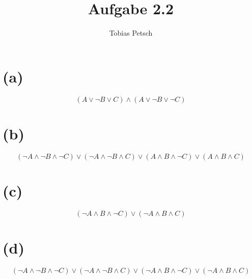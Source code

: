 \documentclass[a4paper,12pt]{article}
\title{Aufgabe 2.2}
\author{Tobias Petsch}
\date{}
\begin{document}
\maketitle

\section*{(a)}

\[
(A \lor \neg B \lor C) \land (A \lor \neg B \lor \neg C)
\]

\section*{(b)}

\[
(\neg A \land \neg B \land \neg C) \lor (\neg A \land \neg B \land C) \lor (A \land B \land \neg C) \lor (A \land B \land C)
\]

\section*{(c)}

\[
(\neg A \land B \land \neg C) \lor (\neg A \land B \land C)
\]

\section*{(d)}

\[
(\neg A \land \neg B \land \neg C) \lor (\neg A \land \neg B \land C) \lor (\neg A \land B \land \neg C) \lor (\neg A \land B \land C)
\]

\end{document}
